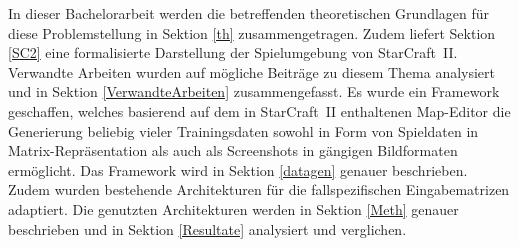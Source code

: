 In dieser Bachelorarbeit werden die betreffenden theoretischen Grundlagen für diese Problemstellung in Sektion \ref{th} zusammengetragen. Zudem liefert Sektion \ref{SC2} eine formalisierte Darstellung der Spielumgebung von StarCraft~II. Verwandte Arbeiten wurden auf mögliche Beiträge zu diesem Thema analysiert und in Sektion \ref{VerwandteArbeiten} zusammengefasst. Es wurde ein Framework geschaffen, welches basierend auf dem in StarCraft~II enthaltenen Map-Editor die Generierung beliebig vieler Trainingsdaten sowohl in Form von Spieldaten in Matrix-Repräsentation als auch als Screenshots in gängigen Bildformaten ermöglicht. Das Framework wird in Sektion \ref{datagen} genauer beschrieben. Zudem wurden bestehende Architekturen für die fallspezifischen Eingabematrizen adaptiert. Die genutzten Architekturen werden in Sektion \ref{Meth} genauer beschrieben und in Sektion \ref{Resultate} analysiert und verglichen. 